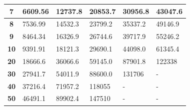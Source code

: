 \begin{table}[H]
\begin{tabular}{|c|l|l|l|l|l|}
\textbf{7}                                                                          & 6609.56                              & 12737.8                               & 20853.7                               & 30956.8                               & 43047.6                               \\ \hline
\textbf{8}                                                                          & 7536.99                              & 14532.3                               & 23799.2                               & 35337.2                               & 49146.9                               \\ \hline
\textbf{9}                                                                          & 8464.34                              & 16326.9                               & 26744.6                               & 39717.9                               & 55246.2                               \\ \hline
\textbf{10}                                                                         & 9391.91                              & 18121.3                               & 29690.1                               & 44098.0                               & 61345.4                               \\ \hline
\textbf{20}                                                                         & 18666.6                              & 36066.6                               & 59145.0                               & 87901.8                               & 122338                                \\ \hline
\textbf{30}                                                                         & 27941.7                              & 54011.9                               & 88600.0                               & 131706                                & -                                     \\ \hline
\textbf{40}                                                                         & 37216.4                              & 71957.2                               & 118055                                & -                                     & -                                     \\ \hline
\textbf{50}                                                                         & 46491.1                              & 89902.4                               & 147510                                & -                                     & -                                     \\ \hline

\end{tabular}
\end{table}
